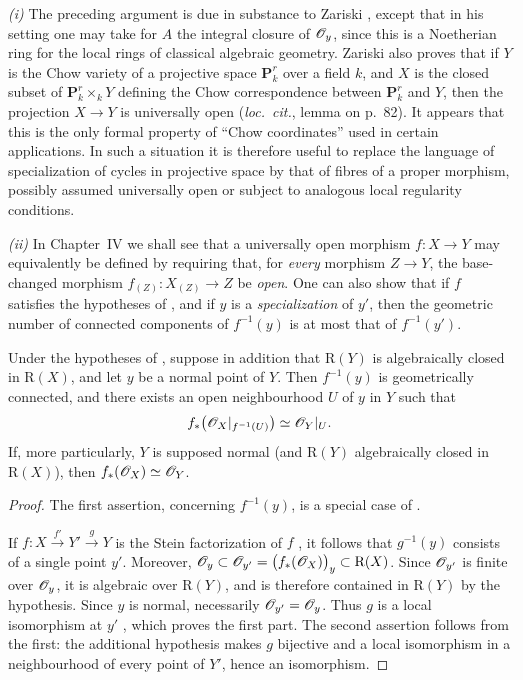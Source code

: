 \begin{remark}[4.3.11]
\label{III.4.3.11}
\emph{(i)}
The preceding argument is due in substance to Zariski
\cite{I-20}, except that in his setting one may take for $A$ the
integral closure of $\mathscr{O}_y$, since this is a Noetherian ring for
the local rings of classical algebraic geometry.  Zariski also
proves that if $Y$ is the Chow variety of a projective space
$\mathbf{P}_k^r$ over a field $k$, and $X$ is the closed subset of
$\mathbf{P}_k^r\times_kY$ defining the Chow correspondence between
$\mathbf{P}_k^r$ and $Y$, then the projection $X\to Y$ is
universally open (\emph{loc.\ cit.}, lemma on p.~82).
It appears that this is the only formal property of ``Chow
coordinates'' used in certain applications.  In such a situation it
is therefore useful to replace the language of specialization of
cycles in projective space by that of fibres of a proper morphism,
possibly assumed universally open or subject to analogous local
regularity conditions.

\emph{(ii)}
In Chapter~IV we shall see that a universally open morphism
$f:X\to Y$ may equivalently be defined by requiring that, for \emph{every}
morphism $Z\to Y$, the base-changed morphism
$f_{(Z)}:X_{(Z)}\to Z$ be \emph{open}.  One can also show that if $f$
satisfies the hypotheses of , and if $y$ is a
\emph{specialization} of $y'$, then the geometric number of connected
components of $f^{-1}(y)$ is at most that of $f^{-1}(y')$.
\end{remark}

\begin{corollary}[4.3.12]
\label{III.4.3.12}
Under the hypotheses of , suppose in addition that
$\mathrm{R}(Y)$ is algebraically closed in $\mathrm{R}(X)$, and let $y$ be a
normal point of $Y$.  Then $f^{-1}(y)$ is geometrically connected,
and there exists an open neighbourhood $U$ of $y$ in $Y$ such that
\[
  f_*\bigl(\mathscr{O}_X|_{f^{-1}(U)}\bigr)
  \simeq
  \mathscr{O}_Y|_U.
\]
If, more particularly, $Y$ is supposed normal (and $\mathrm{R}(Y)$ algebraically closed
in $\mathrm{R}(X)$), then $f_*(\mathscr{O}_X)\simeq\mathscr{O}_Y$.
\end{corollary}

\begin{proof}
The first assertion, concerning $f^{-1}(y)$, is a special case of
.


If $f:X\xrightarrow{f'}Y'\xrightarrow{g}Y$
is the Stein factorization of $f$ , it follows that
$g^{-1}(y)$ consists of a single point $y'$.  Moreover, $\mathscr{O}_y
\subset
\mathscr{O}_{y'}
=
\bigl(f_*(\mathscr{O}_X)\bigr)_y
\subset
\mathrm{R}(X)$.
Since $\mathscr{O}_{y'}$ is finite over $\mathscr{O}_y$, it is algebraic over
$\mathrm{R}(Y)$, and is therefore contained in $\mathrm{R}(Y)$ by the
hypothesis.  Since
$y$ is normal, necessarily $\mathscr{O}_{y'}=\mathscr{O}_y$.  Thus $g$ is a
local isomorphism at $y'$ , which proves the first
part.  The second assertion follows from the first: the additional
hypothesis makes $g$ bijective and a local isomorphism in a
neighbourhood of every point of $Y'$, hence an isomorphism.
\end{proof}

